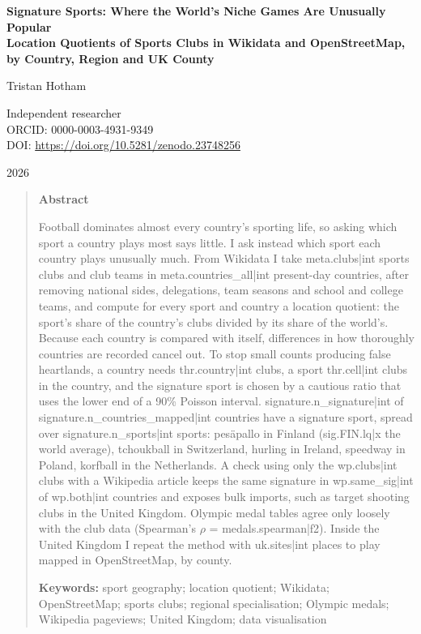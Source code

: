 \documentclass[11pt,a4paper]{article}
\begin{document}
\begin{center}
{\Large\bfseries Signature Sports: Where the World's Niche Games Are Unusually Popular\\[2pt] Location Quotients of Sports Clubs in Wikidata and OpenStreetMap, by Country, Region and UK County\par}
\vspace{1.2em}
{\large Tristan Hotham\par}
\vspace{0.3em}
{\small Independent researcher\\
ORCID: 0000-0003-4931-9349\\
DOI: \href{https://doi.org/10.5281/zenodo.23748256}{https://doi.org/10.5281/zenodo.23748256}\par}
\vspace{0.8em}
2026
\end{center}

\begin{quote}
\small
\begin{center}\textbf{Abstract}\end{center}
Football dominates almost every country's sporting life, so asking which sport a country plays most says little. I ask instead which sport each country plays unusually much. From Wikidata I take {{meta.clubs|int}} sports clubs and club teams in {{meta.countries_all|int}} present-day countries, after removing national sides, delegations, team seasons and school and college teams, and compute for every sport and country a location quotient: the sport's share of the country's clubs divided by its share of the world's. Because each country is compared with itself, differences in how thoroughly countries are recorded cancel out. To stop small counts producing false heartlands, a country needs {{thr.country|int}} clubs, a sport {{thr.cell|int}} clubs in the country, and the signature sport is chosen by a cautious ratio that uses the lower end of a 90\% Poisson interval. {{signature.n_signature|int}} of {{signature.n_countries_mapped|int}} countries have a signature sport, spread over {{signature.n_sports|int}} sports: pesäpallo in Finland ({{sig.FIN.lq|x}} the world average), tchoukball in Switzerland, hurling in Ireland, speedway in Poland, korfball in the Netherlands. A check using only the {{wp.clubs|int}} clubs with a Wikipedia article keeps the same signature in {{wp.same_sig|int}} of {{wp.both|int}} countries and exposes bulk imports, such as target shooting clubs in the United Kingdom. Olympic medal tables agree only loosely with the club data (Spearman's $\rho$ = {{medals.spearman|f2}}). Inside the United Kingdom I repeat the method with {{uk.sites|int}} places to play mapped in OpenStreetMap, by county.

\textbf{Keywords:} sport geography; location quotient; Wikidata; OpenStreetMap; sports clubs; regional specialisation; Olympic medals; Wikipedia pageviews; United Kingdom; data visualisation
\end{quote}
\end{document}
